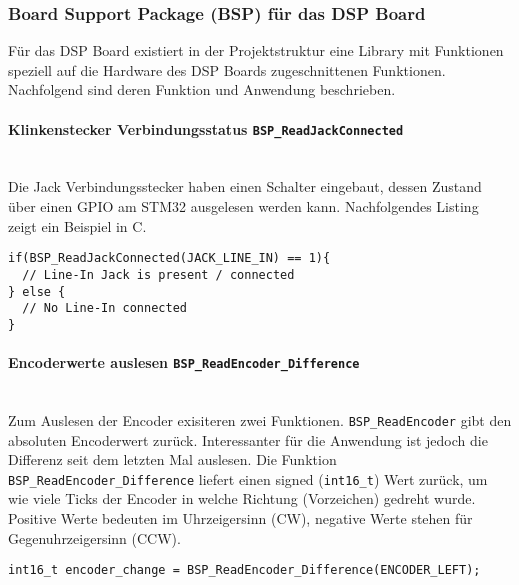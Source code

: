 \subsubsection{Board Support Package (BSP) für das DSP Board}
\label{sec:LibBSP}

Für das DSP Board existiert in der Projektstruktur eine Library mit Funktionen speziell auf die Hardware des DSP Boards zugeschnittenen Funktionen.
Nachfolgend sind deren Funktion und Anwendung beschrieben.
\\
\paragraph{Klinkenstecker Verbindungsstatus \texttt{BSP\_ReadJackConnected}}\vspace{-0.3cm}\\
Die Jack Verbindungsstecker haben einen Schalter eingebaut, dessen Zustand über einen GPIO am STM32 ausgelesen werden kann.
Nachfolgendes Listing zeigt ein Beispiel in C.\\
\begin{lstlisting}[style=Cuvision,caption={Verbindungsstatus des Line-In auslesen}]
if(BSP_ReadJackConnected(JACK_LINE_IN) == 1){
  // Line-In Jack is present / connected
} else {
  // No Line-In connected
}
\end{lstlisting}


\paragraph{Encoderwerte auslesen \texttt{BSP\_ReadEncoder\_Difference}}\vspace{-0.3cm}\\
Zum Auslesen der Encoder exisiteren zwei Funktionen.
\texttt{BSP\_ReadEncoder} gibt den absoluten Encoderwert zurück.
Interessanter für die Anwendung ist jedoch die Differenz seit dem letzten Mal auslesen.
Die Funktion \texttt{BSP\_ReadEncoder\_Difference} liefert einen signed (\texttt{int16\_t}) Wert zurück, um wie viele Ticks der Encoder in welche Richtung (Vorzeichen) gedreht wurde.
Positive Werte bedeuten im Uhrzeigersinn (CW), negative Werte stehen für Gegenuhrzeigersinn (CCW). \\
\begin{lstlisting}[style=Cuvision,caption={Auslesen wie weit und in welche Richtung der linke Encoder gedreht wurde.}]
int16_t encoder_change = BSP_ReadEncoder_Difference(ENCODER_LEFT);
\end{lstlisting}


